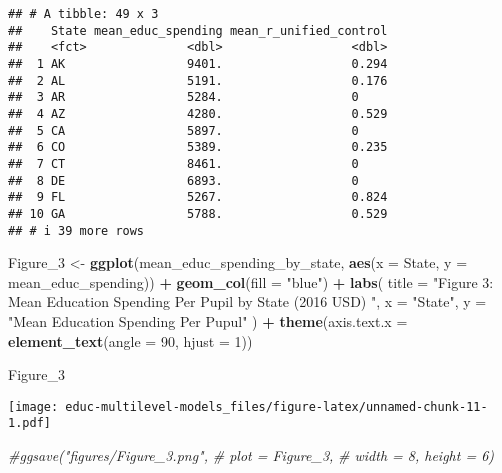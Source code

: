 \documentclass[
]{article}
\newenvironment{Shaded}{\begin{snugshade}}{\end{snugshade}}
\newcommand{\AttributeTok}[1]{\textcolor[rgb]{0.13,0.29,0.53}{#1}}
\newcommand{\CommentTok}[1]{\textcolor[rgb]{0.56,0.35,0.01}{\textit{#1}}}
\newcommand{\DecValTok}[1]{\textcolor[rgb]{0.00,0.00,0.81}{#1}}
\newcommand{\FunctionTok}[1]{\textcolor[rgb]{0.13,0.29,0.53}{\textbf{#1}}}
\newcommand{\NormalTok}[1]{#1}
\newcommand{\OtherTok}[1]{\textcolor[rgb]{0.56,0.35,0.01}{#1}}
\newcommand{\SpecialCharTok}[1]{\textcolor[rgb]{0.81,0.36,0.00}{\textbf{#1}}}
\newcommand{\StringTok}[1]{\textcolor[rgb]{0.31,0.60,0.02}{#1}}
\begin{document}
\begin{verbatim}
## # A tibble: 49 x 3
##    State mean_educ_spending mean_r_unified_control
##    <fct>              <dbl>                  <dbl>
##  1 AK                 9401.                  0.294
##  2 AL                 5191.                  0.176
##  3 AR                 5284.                  0    
##  4 AZ                 4280.                  0.529
##  5 CA                 5897.                  0    
##  6 CO                 5389.                  0.235
##  7 CT                 8461.                  0    
##  8 DE                 6893.                  0    
##  9 FL                 5267.                  0.824
## 10 GA                 5788.                  0.529
## # i 39 more rows
\end{verbatim}

\begin{Shaded}
\begin{Highlighting}[]
\NormalTok{Figure\_3 }\OtherTok{\textless{}{-}} \FunctionTok{ggplot}\NormalTok{(mean\_educ\_spending\_by\_state, }\FunctionTok{aes}\NormalTok{(}\AttributeTok{x =}\NormalTok{ State, }\AttributeTok{y =}\NormalTok{ mean\_educ\_spending)) }\SpecialCharTok{+}
  \FunctionTok{geom\_col}\NormalTok{(}\AttributeTok{fill =} \StringTok{"blue"}\NormalTok{) }\SpecialCharTok{+}
  \FunctionTok{labs}\NormalTok{(}
    \AttributeTok{title =} \StringTok{"Figure 3: Mean Education Spending Per Pupil by State (2016 USD) "}\NormalTok{,}
    \AttributeTok{x =} \StringTok{"State"}\NormalTok{,}
    \AttributeTok{y =} \StringTok{"Mean Education Spending Per Pupul"}
\NormalTok{  ) }\SpecialCharTok{+}
  \FunctionTok{theme}\NormalTok{(}\AttributeTok{axis.text.x =} \FunctionTok{element\_text}\NormalTok{(}\AttributeTok{angle =} \DecValTok{90}\NormalTok{, }\AttributeTok{hjust =} \DecValTok{1}\NormalTok{))}

\NormalTok{Figure\_3}
\end{Highlighting}
\end{Shaded}

\texttt{[image: educ-multilevel-models\_files/figure-latex/unnamed-chunk-11-1.pdf]}

\begin{Shaded}
\begin{Highlighting}[]
\CommentTok{\#ggsave("figures/Figure\_3.png", }
\CommentTok{\#       plot = Figure\_3, }
\CommentTok{\#       width = 8, height = 6)}
\end{Highlighting}
\end{Shaded}
\end{document}
